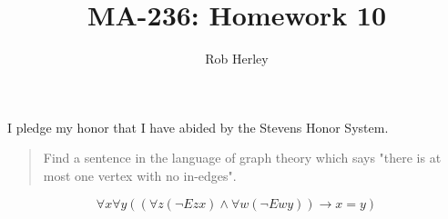\documentclass[12pt]{article}
\begin{document}
\title{MA-236: Homework 10}
\author{Rob Herley}
\maketitle

\begin{center}
I pledge my honor that I have abided by the Stevens Honor System.
\end{center}

\begin{quotation}
  Find a sentence in the language of graph theory which says "there is at most one vertex with no in-edges".
\end{quotation}

$$\forall x \forall y ((\forall z ( \neg Ezx ) \land \forall w (\neg Ewy)) \rightarrow x = y)$$
\end{document}
